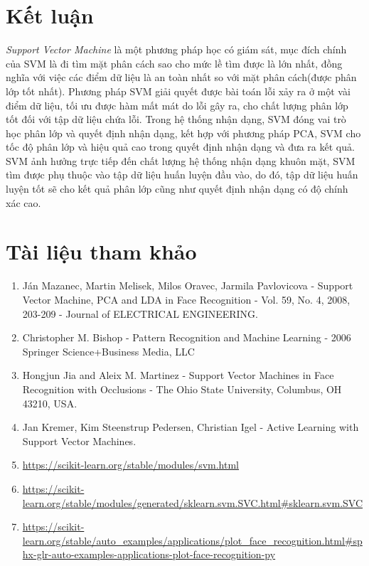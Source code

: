 \documentclass[12pt,a4paper]{article}
\begin{document}
\section{Kết luận}
\textit{Support Vector Machine} là một phương pháp học có giám sát, mục đích chính của SVM là đi tìm mặt phân cách sao cho mức lề tìm được là lớn nhất, đồng nghĩa với việc các điểm dữ liệu là an toàn nhất so với mặt phân cách(được phân lớp tốt nhất). Phương pháp SVM giải quyết được bài toán lỗi xảy ra ở một vài điểm dữ liệu, tối ưu được hàm mất mát do lỗi gây ra, cho chất lượng phân lớp tốt đối với tập dữ liệu chứa lỗi. Trong hệ thống nhận dạng, SVM đóng vai trò học phân lớp và quyết định nhận dạng, kết hợp với phương pháp PCA, SVM cho tốc độ phân lớp và hiệu quả cao trong quyết định nhận dạng và đưa ra kết quả. SVM ảnh hưởng trực tiếp đến chất lượng hệ thống nhận dạng khuôn mặt, SVM tìm được phụ thuộc vào tập dữ liệu huấn luyện đầu vào, do đó, tập dữ liệu huấn luyện tốt sẽ cho kết quả phân lớp cũng như quyết định nhận dạng có độ chính xác cao.       
      
\newpage
\section{Tài liệu tham khảo}
\begin{enumerate}
\item Ján Mazanec, Martin Melisek, Milos Oravec, Jarmila Pavlovicova - Support Vector Machine, PCA and LDA in Face Recognition - Vol. 59, No. 4, 2008, 203-209 - Journal of ELECTRICAL ENGINEERING.
\item Christopher M. Bishop - Pattern Recognition and Machine Learning - 2006 Springer Science+Business Media, LLC
\item Hongjun Jia and Aleix M. Martinez - Support Vector Machines in Face Recognition with Occlusions - The Ohio State University, Columbus, OH 43210, USA.
\item Jan Kremer, Kim Steenstrup Pedersen, Christian Igel - Active Learning with Support Vector Machines.

\item \href{url}{https://scikit-learn.org/stable/modules/svm.html}
\item \href{url}{https://scikit-learn.org/stable/modules/generated/sklearn.svm.SVC.html\#sklearn.svm.SVC}
\item \href{url}{https://scikit-learn.org/stable/auto\_examples/applications/plot\_face\_recognition.html\#sphx-glr-auto-examples-applications-plot-face-recognition-py}

\end{enumerate}    
\end{document}
